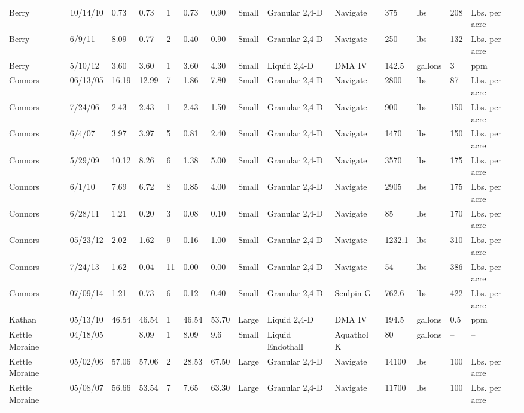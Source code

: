 \documentclass{article}
\begin{document}
\begin{landscape}
\begin{longtable}[l]{lp{14mm}Hp{10mm}HHp{14mm}p{9mm}p{30mm}p{18mm}lp{14mm}p{8mm}l}
  Berry & 10/14/10 & 0.73 & 0.73 &   1 & 0.73 & 0.90 & Small & Granular 2,4-D & Navigate & 375 & lbs & 208 & Lbs. per acre \\ 
  Berry & 6/9/11 & 8.09 & 0.77 &   2 & 0.40 & 0.90 & Small & Granular 2,4-D & Navigate & 250 & lbs & 132 & Lbs. per acre \\ 
  Berry & 5/10/12 & 3.60 & 3.60 &   1 & 3.60 & 4.30 & Small & Liquid 2,4-D & DMA IV & 142.5 & gallons & 3 & ppm \\   
  Connors & 06/13/05 & 16.19 & 12.99 &   7 & 1.86 & 7.80 & Small & Granular 2,4-D & Navigate & 2800 & lbs & 87 & Lbs. per acre \\ 
  Connors & 7/24/06 & 2.43 & 2.43 &   1 & 2.43 & 1.50 & Small & Granular 2,4-D & Navigate & 900 & lbs & 150 & Lbs. per acre \\ 
  Connors & 6/4/07 & 3.97 & 3.97 &   5 & 0.81 & 2.40 & Small & Granular 2,4-D & Navigate & 1470 & lbs & 150 & Lbs. per acre \\ 
  Connors & 5/29/09 & 10.12 & 8.26 &   6 & 1.38 & 5.00 & Small & Granular 2,4-D & Navigate & 3570 & lbs & 175 & Lbs. per acre \\ 
  Connors & 6/1/10 & 7.69 & 6.72 &   8 & 0.85 & 4.00 & Small & Granular 2,4-D & Navigate & 2905 & lbs & 175 & Lbs. per acre \\ 
  Connors & 6/28/11 & 1.21 & 0.20 &   3 & 0.08 & 0.10 & Small & Granular 2,4-D & Navigate & 85 & lbs & 170 & Lbs. per acre \\ 
  Connors & 05/23/12 & 2.02 & 1.62 &   9 & 0.16 & 1.00 & Small & Granular 2,4-D & Navigate & 1232.1 & lbs & 310 & Lbs. per acre \\ 
  Connors & 7/24/13 & 1.62 & 0.04 &  11 & 0.00 & 0.00 & Small & Granular 2,4-D & Navigate & 54 & lbs & 386 & Lbs. per acre \\ 
  Connors & 07/09/14 & 1.21 & 0.73 &   6 & 0.12 & 0.40 & Small & Granular 2,4-D & Sculpin G & 762.6 & lbs & 422 & Lbs. per acre \\   
  Kathan & 05/13/10 & 46.54 & 46.54 &   1 & 46.54 & 53.70 & Large & Liquid 2,4-D & DMA IV & 194.5 & gallons & 0.5 & ppm \\ 
  Kettle Moraine & 04/18/05 &  & 8.09 &  1 & 8.09 & 9.6 & Small & Liquid Endothall & Aquathol K & 80 & gallons & -- & -- \\ 
  Kettle Moraine & 05/02/06 & 57.06 & 57.06 &   2 & 28.53 & 67.50 & Large & Granular 2,4-D & Navigate & 14100 & lbs & 100 & Lbs. per acre \\ 
  Kettle Moraine & 05/08/07 & 56.66 & 53.54 &   7 & 7.65 & 63.30 & Large & Granular 2,4-D & Navigate & 11700 & lbs & 100 & Lbs. per acre \\ 

\end{longtable}
\end{landscape}
\end{document}
